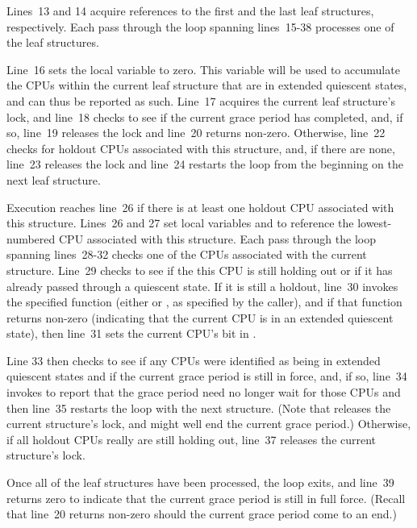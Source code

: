 Lines~13 and 14 acquire references to the first and the last leaf
 structures, respectively.
Each pass through the loop spanning lines~15-38 processes one of
the leaf  structures.

Line~16 sets the local variable  to zero.
This variable will be used to accumulate the CPUs within the current
leaf  structure that are in extended quiescent states, and
can thus be reported as such.
Line~17 acquires the current leaf  structure's lock,
and line~18 checks to see if the current grace period has completed,
and, if so, line~19 releases the lock and line~20 returns non-zero.
Otherwise, line~22 checks for holdout CPUs associated with this
 structure, and, if there are none, line~23 releases
the lock and line~24 restarts the loop from the beginning on the
next leaf  structure.

Execution reaches line~26 if there is at least one holdout CPU associated
with this  structure.
Lines~26 and 27 set local variables  and  to reference
the lowest-numbered CPU associated with this  structure.
Each pass through the loop spanning lines~28-32 checks one of the
CPUs associated with the current  structure.
Line~29 checks to see if the this CPU is still holding out or if
it has already passed through a quiescent state.
If it is still a holdout, line~30 invokes the specified function
(either  or
, as specified by the caller), and
if that function returns non-zero (indicating that the current CPU
is in an extended quiescent state), then line~31 sets the current
CPU's bit in .

Line 33 then checks to see if any CPUs were identified as being
in extended quiescent states and if the current grace period is
still in force, and, if so, line~34 invokes 
to report that the grace period need no longer wait for those
CPUs and then line~35 restarts the loop with the next 
structure.
(Note that  releases the current 
structure's lock, and might well end the current grace period.)
Otherwise, if all holdout CPUs really are still holding out, line~37
releases the current  structure's lock.

Once all of the leaf  structures have been processed,
the loop exits, and line~39 returns zero to indicate that the current
grace period is still in full force.
(Recall that line~20 returns non-zero should the current grace period
come to an end.)

